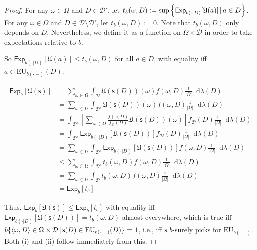 \documentclass[a4paper]{article}
\newcommand\X{\mathcal{X}}
\newcommand\D{\mathcal{D}}
\newcommand\s{\mathsf{s}}
\newcommand\Exp{\mathsf{Exp}}
\newcommand\EU{\mathrm{EU}}
\newcommand\U{\mathfrak{U}} %
\newcommand{\pb}{b}
\newcommand\SetDelimiter[1][]{
	\nonscript\,#1\vert \allowbreak \nonscript\,\mathopen{}}
\providecommand\given{\SetDelimiter}
\newcommand*\diff{\mathop{}\!\mathrm{d}}
\renewcommand{\leq}{\leqslant}
\newenvironment{CCM rewritten}
{\begingroup\color{blue}} %
{\endgroup}              %
\begin{document}
\begin{proof}
	For any $\omega\in\Omega$ and $D\in\D'$, let $t_\pb(\omega,D):=\sup\left\{\Exp_{\pb(\cdot|D)}[\U(a)]\given a\in D\right\}$. For any $\omega\in\Omega$ and $D\in\D\setminus\D'$, let $t_b(\omega,D):=0$. Note that $t_\pb(\omega,D)$ only depends on $D$. Nevertheless, we define it as a function on $\Omega\times\D$ in order to take expectations relative to $\pb$. 
	
	So $\Exp_{\pb(\cdot|D)}[\U(a)]\leq t_b(\omega,D)$ for all $a\in D$, with equality iff $a\in \EU_{\pb(\cdot|-)}(D)$. 
	
	
	

	

{\allowdisplaybreaks
\begin{align}
\Exp_\pb[\U(\s)]&=\sum_{\omega\in\Omega}\int_{\D} \U(\s(D))(\omega) f(\omega,D) \frac{1}{|\Omega|}\diff\lambda(D)\\
&=\sum_{\omega\in\Omega}\int_{\D'} \U(\s(D))(\omega) f(\omega,D) \frac{1}{|\Omega|}\diff\lambda(D)\\
&=\int_{\D'}\left[\sum_{\omega\in\Omega}\frac{f(\omega,D)}{f_\D(D)}\U(\s(D))(\omega)\right]f_\D(D)\frac{1}{|\Omega|}\diff\lambda(D)\\
&=\int_{\D'}\Exp_{\pb(\cdot|D)}[\U(\s(D))]f_\D(D)\frac{1}{|\Omega|}\diff\lambda(D)\\
&=\sum_{\omega\in\Omega}\int_{\D'}\Exp_{\pb(\cdot|D)}[\U(\s(D))]f(\omega,D)\frac{1}{|\Omega|}\diff\lambda(D)\\
&\leq\sum_{\omega\in\Omega}\int_{\D'}t_b(\omega,D)f(\omega,D)\frac{1}{|\Omega|}\diff\lambda(D)\\
&=\sum_{\omega\in\Omega}\int_{\D}t_b(\omega,D)f(\omega,D)\frac{1}{|\Omega|}\diff\lambda(D)\\
&=\Exp_\pb[t_b]
\end{align}}

	Thus, $\Exp_b[\U(\s)]\leq \Exp_b [t_b]$ with equality iff $\Exp_{\pb(\cdot|D)}[\U(\s(D))]=t_b(\omega,D)$ almost everywhere, which is true iff $b\{\left<\omega,D\right> \in \Omega\times\D \given \s(D)\in \EU_{\pb(\cdot|-)}(D)\}=1$, i.e., iff $\s$ $\pb$-surely picks for $\EU_{\pb(\cdot|-)}$. Both (i) and (ii) follow immediately from this.


\end{proof}
\end{document}
